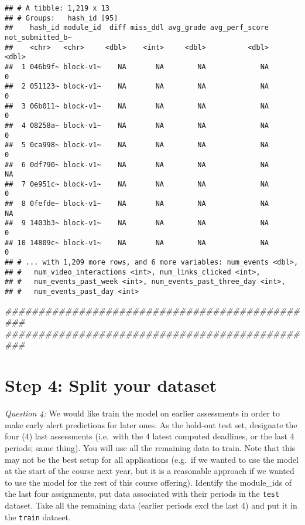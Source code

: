 \documentclass[
]{article}
\newenvironment{Shaded}{\begin{snugshade}}{\end{snugshade}}
\newcommand{\CommentTok}[1]{\textcolor[rgb]{0.56,0.35,0.01}{\textit{#1}}}
\begin{document}
\begin{verbatim}
## # A tibble: 1,219 x 13
## # Groups:   hash_id [95]
##    hash_id module_id  diff miss_ddl avg_grade avg_perf_score not_submitted_b~
##    <chr>   <chr>     <dbl>    <int>     <dbl>          <dbl>            <dbl>
##  1 046b9f~ block-v1~    NA       NA        NA             NA                0
##  2 051123~ block-v1~    NA       NA        NA             NA                0
##  3 06b011~ block-v1~    NA       NA        NA             NA                0
##  4 08258a~ block-v1~    NA       NA        NA             NA                0
##  5 0ca998~ block-v1~    NA       NA        NA             NA                0
##  6 0df790~ block-v1~    NA       NA        NA             NA               NA
##  7 0e951c~ block-v1~    NA       NA        NA             NA                0
##  8 0fefde~ block-v1~    NA       NA        NA             NA               NA
##  9 1403b3~ block-v1~    NA       NA        NA             NA                0
## 10 14809c~ block-v1~    NA       NA        NA             NA                0
## # ... with 1,209 more rows, and 6 more variables: num_events <dbl>,
## #   num_video_interactions <int>, num_links_clicked <int>,
## #   num_events_past_week <int>, num_events_past_three_day <int>,
## #   num_events_past_day <int>
\end{verbatim}

\begin{Shaded}
\begin{Highlighting}[]
\CommentTok{###############################################}
\CommentTok{###############################################}
\end{Highlighting}
\end{Shaded}

\hypertarget{step-4-split-your-dataset}{%
\section{Step 4: Split your dataset}\label{step-4-split-your-dataset}}

\emph{Question 4:} We would like train the model on earlier assessments
in order to make early alert predictions for later ones. As the hold-out
test set, designate the four (4) last assessments (i.e.~with the 4
latest computed deadlines, or the last 4 periods; same thing). You will
use all the remaining data to train. Note that this may not be the best
setup for all applications (e.g.~if we wanted to use the model at the
start of the course next year, but it is a reasonable approach if we
wanted to use the model for the rest of this course offering). Identify
the module\_ids of the last four assignments, put data associated with
their periods in the \texttt{test} dataset. Take all the remaining data
(earlier periods excl the last 4) and put it in the \texttt{train}
dataset.
\end{document}
